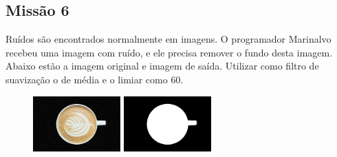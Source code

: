 \documentclass[
	12pt,				%
	oneside,			%
	a4paper,			%
	english,			%
	french,				%
	spanish,			%
	brazil,				%
	]{abntex2}
\begin{document}
\begin{apendicesenv}
\subsection{Missão 6}

Ruídos são encontrados normalmente em imagens. O programador Marinalvo recebeu uma imagem com ruído, e ele precisa remover o fundo desta imagem. Abaixo estão a imagem original e imagem de saída. Utilizar como filtro de suavização o de média e o limiar como 60.

\begin{figure}[H]
\centering
\includegraphics[width=0.3\textwidth]{imagens/desafioestudio/mission6_input.jpg}
\includegraphics[width=0.3\textwidth]{imagens/desafioestudio/mission6_output.png}
\end{figure}



\end{apendicesenv}


\printindex
\end{document}
